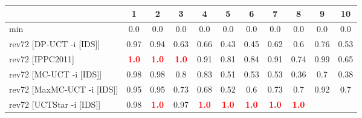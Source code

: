 \documentclass{article}
\begin{document}
\begin{tabular}{|l|r@{$\pm$}rr@{$\pm$}rr@{$\pm$}rr@{$\pm$}rr@{$\pm$}rr@{$\pm$}rr@{$\pm$}rr@{$\pm$}rr@{$\pm$}rr@{$\pm$}r|}
\hline

& \multicolumn{2}{c}{1}
& \multicolumn{2}{c}{2}
& \multicolumn{2}{c}{3}
& \multicolumn{2}{c}{4}
& \multicolumn{2}{c}{5}
& \multicolumn{2}{c}{6}
& \multicolumn{2}{c}{7}
& \multicolumn{2}{c}{8}
& \multicolumn{2}{c}{9}
& \multicolumn{2}{c|}{10}
\\
\hline
\hline
min
& \multicolumn{2}{c}{0.0}
& \multicolumn{2}{c}{0.0}
& \multicolumn{2}{c}{0.0}
& \multicolumn{2}{c}{0.0}
& \multicolumn{2}{c}{0.0}
& \multicolumn{2}{c}{0.0}
& \multicolumn{2}{c}{0.0}
& \multicolumn{2}{c}{0.0}
& \multicolumn{2}{c}{0.0}
& \multicolumn{2}{c|}{0.0}
\\
rev72 [DP-UCT -i [IDS]]
& \multicolumn{2}{c}{0.97}
& \multicolumn{2}{c}{0.94}
& \multicolumn{2}{c}{0.63}
& \multicolumn{2}{c}{0.66}
& \multicolumn{2}{c}{0.43}
& \multicolumn{2}{c}{0.45}
& \multicolumn{2}{c}{0.62}
& \multicolumn{2}{c}{0.6}
& \multicolumn{2}{c}{0.76}
& \multicolumn{2}{c|}{0.53}
\\
rev72 [IPPC2011]
& \multicolumn{2}{c}{\textbf{\textcolor{red}{1.0}}}
& \multicolumn{2}{c}{\textbf{\textcolor{red}{1.0}}}
& \multicolumn{2}{c}{\textbf{\textcolor{red}{1.0}}}
& \multicolumn{2}{c}{0.91}
& \multicolumn{2}{c}{0.81}
& \multicolumn{2}{c}{0.84}
& \multicolumn{2}{c}{0.91}
& \multicolumn{2}{c}{0.74}
& \multicolumn{2}{c}{0.99}
& \multicolumn{2}{c|}{0.65}
\\
rev72 [MC-UCT -i [IDS]]
& \multicolumn{2}{c}{0.98}
& \multicolumn{2}{c}{0.98}
& \multicolumn{2}{c}{0.8}
& \multicolumn{2}{c}{0.83}
& \multicolumn{2}{c}{0.51}
& \multicolumn{2}{c}{0.53}
& \multicolumn{2}{c}{0.53}
& \multicolumn{2}{c}{0.36}
& \multicolumn{2}{c}{0.7}
& \multicolumn{2}{c|}{0.38}
\\
rev72 [MaxMC-UCT -i [IDS]]
& \multicolumn{2}{c}{0.95}
& \multicolumn{2}{c}{0.95}
& \multicolumn{2}{c}{0.73}
& \multicolumn{2}{c}{0.68}
& \multicolumn{2}{c}{0.52}
& \multicolumn{2}{c}{0.6}
& \multicolumn{2}{c}{0.73}
& \multicolumn{2}{c}{0.7}
& \multicolumn{2}{c}{0.92}
& \multicolumn{2}{c|}{0.7}
\\
rev72 [UCTStar -i [IDS]]
& \multicolumn{2}{c}{0.98}
& \multicolumn{2}{c}{\textbf{\textcolor{red}{1.0}}}
& \multicolumn{2}{c}{0.97}
& \multicolumn{2}{c}{\textbf{\textcolor{red}{1.0}}}
& \multicolumn{2}{c}{\textbf{\textcolor{red}{1.0}}}
& \multicolumn{2}{c}{\textbf{\textcolor{red}{1.0}}}
& \multicolumn{2}{c}{\textbf{\textcolor{red}{1.0}}}
& \multicolumn{2}{c}{\textbf{\textcolor{red}{1.0}}}

\end{tabular}
\end{document}
